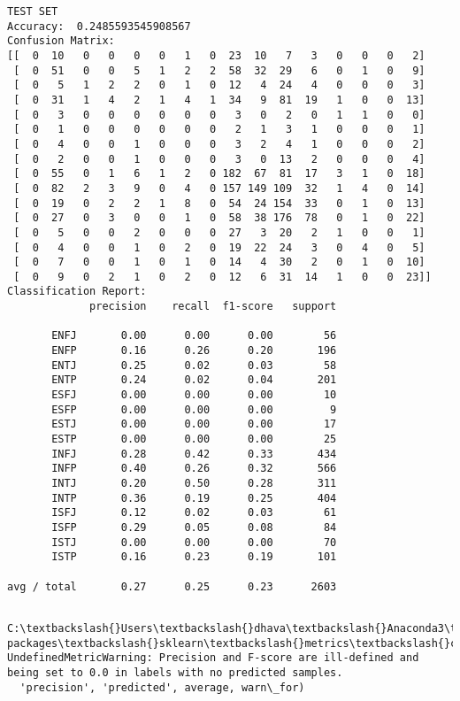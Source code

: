 \documentclass[11pt]{article}
\begin{document}
\begin{Verbatim}[commandchars=\\\{\}]
TEST SET
Accuracy:  0.2485593545908567
Confusion Matrix:
[[  0  10   0   0   0   0   1   0  23  10   7   3   0   0   0   2]
 [  0  51   0   0   5   1   2   2  58  32  29   6   0   1   0   9]
 [  0   5   1   2   2   0   1   0  12   4  24   4   0   0   0   3]
 [  0  31   1   4   2   1   4   1  34   9  81  19   1   0   0  13]
 [  0   3   0   0   0   0   0   0   3   0   2   0   1   1   0   0]
 [  0   1   0   0   0   0   0   0   2   1   3   1   0   0   0   1]
 [  0   4   0   0   1   0   0   0   3   2   4   1   0   0   0   2]
 [  0   2   0   0   1   0   0   0   3   0  13   2   0   0   0   4]
 [  0  55   0   1   6   1   2   0 182  67  81  17   3   1   0  18]
 [  0  82   2   3   9   0   4   0 157 149 109  32   1   4   0  14]
 [  0  19   0   2   2   1   8   0  54  24 154  33   0   1   0  13]
 [  0  27   0   3   0   0   1   0  58  38 176  78   0   1   0  22]
 [  0   5   0   0   2   0   0   0  27   3  20   2   1   0   0   1]
 [  0   4   0   0   1   0   2   0  19  22  24   3   0   4   0   5]
 [  0   7   0   0   1   0   1   0  14   4  30   2   0   1   0  10]
 [  0   9   0   2   1   0   2   0  12   6  31  14   1   0   0  23]]
Classification Report:
             precision    recall  f1-score   support

       ENFJ       0.00      0.00      0.00        56
       ENFP       0.16      0.26      0.20       196
       ENTJ       0.25      0.02      0.03        58
       ENTP       0.24      0.02      0.04       201
       ESFJ       0.00      0.00      0.00        10
       ESFP       0.00      0.00      0.00         9
       ESTJ       0.00      0.00      0.00        17
       ESTP       0.00      0.00      0.00        25
       INFJ       0.28      0.42      0.33       434
       INFP       0.40      0.26      0.32       566
       INTJ       0.20      0.50      0.28       311
       INTP       0.36      0.19      0.25       404
       ISFJ       0.12      0.02      0.03        61
       ISFP       0.29      0.05      0.08        84
       ISTJ       0.00      0.00      0.00        70
       ISTP       0.16      0.23      0.19       101

avg / total       0.27      0.25      0.23      2603


    \end{Verbatim}

    \begin{Verbatim}[commandchars=\\\{\}]
C:\textbackslash{}Users\textbackslash{}dhava\textbackslash{}Anaconda3\textbackslash{}lib\textbackslash{}site-packages\textbackslash{}sklearn\textbackslash{}metrics\textbackslash{}classification.py:1135: UndefinedMetricWarning: Precision and F-score are ill-defined and being set to 0.0 in labels with no predicted samples.
  'precision', 'predicted', average, warn\_for)

    \end{Verbatim}
\end{document}
